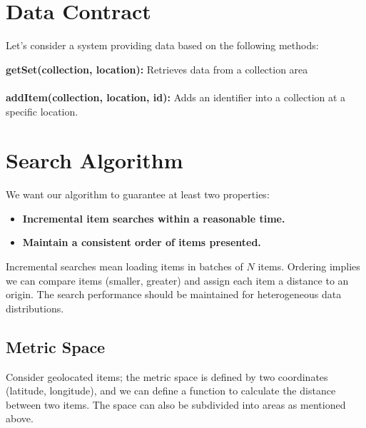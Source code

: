 \documentclass[11pt]{article}
\begin{document}
\vspace{1em}

\section*{Data Contract}

Let’s consider a system providing data based on the following methods:

\vspace{2em}

\begin{tcolorbox}[colframe=black!75!black]
    \textbf{getSet(collection, location):} Retrieves data from a collection area\\ \\
    \textbf{addItem(collection, location, id):} Adds an identifier into a collection at a specific location.
\end{tcolorbox}

\vspace{1em}

\section*{Search Algorithm}

We want our algorithm to guarantee at least two properties:

\vspace{1em}

\begin{itemize}[noitemsep, topsep=2pt]
    \item \textbf{Incremental item searches within a reasonable time.}
    \item \textbf{Maintain a consistent order of items presented.}
\end{itemize}

\vspace{1em}

\noindent Incremental searches mean loading items in batches of \(N\) items. Ordering implies we can compare items (smaller, greater) and assign each item a distance to an origin. The search performance should be maintained for heterogeneous data distributions.

\subsection*{Metric Space}

Consider geolocated items; the metric space is defined by two coordinates (latitude, longitude), and we can define a function to calculate the distance between two items. The space can also be subdivided into areas as mentioned above.
\end{document}
